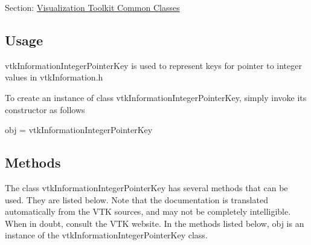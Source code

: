 Section\-: \hyperlink{sec_vtkcommon}{Visualization Toolkit Common Classes} \hypertarget{vtkwidgets_vtkxyplotwidget_Usage}{}\subsection{Usage}\label{vtkwidgets_vtkxyplotwidget_Usage}
vtk\-Information\-Integer\-Pointer\-Key is used to represent keys for pointer to integer values in vtk\-Information.\-h

To create an instance of class vtk\-Information\-Integer\-Pointer\-Key, simply invoke its constructor as follows \begin{DoxyVerb}  obj = vtkInformationIntegerPointerKey
\end{DoxyVerb}
 \hypertarget{vtkwidgets_vtkxyplotwidget_Methods}{}\subsection{Methods}\label{vtkwidgets_vtkxyplotwidget_Methods}
The class vtk\-Information\-Integer\-Pointer\-Key has several methods that can be used. They are listed below. Note that the documentation is translated automatically from the V\-T\-K sources, and may not be completely intelligible. When in doubt, consult the V\-T\-K website. In the methods listed below, {\ttfamily obj} is an instance of the vtk\-Information\-Integer\-Pointer\-Key class. 
